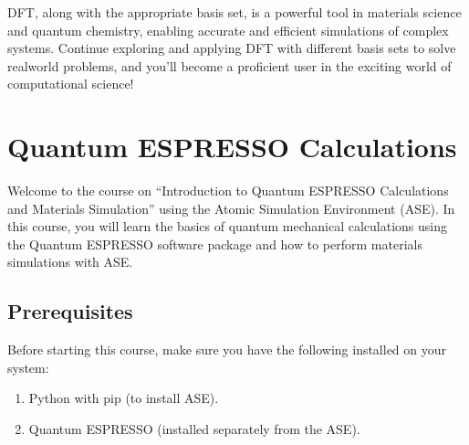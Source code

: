 \documentclass[letterpaper,10pt,english]{sphinxmanual}
\begin{document}
\sphinxAtStartPar
DFT, along with the appropriate basis set, is a powerful tool in materials science and quantum chemistry, enabling accurate and efficient simulations of complex systems. Continue exploring and applying DFT with different basis sets to solve real\sphinxhyphen{}world problems, and you’ll become a proficient user in the exciting world of computational science!

\sphinxstepscope


\chapter{Quantum ESPRESSO Calculations}
\label{\detokenize{qease/qease:quantum-espresso-calculations}}\label{\detokenize{qease/qease::doc}}


\sphinxAtStartPar
Welcome to the course on “Introduction to Quantum ESPRESSO Calculations and Materials Simulation” using the Atomic Simulation Environment (ASE). In this course, you will learn the basics of quantum mechanical calculations using the Quantum ESPRESSO software package and how to perform materials simulations with ASE.


\section{Prerequisites}
\label{\detokenize{qease/qease:prerequisites}}
\sphinxAtStartPar
Before starting this course, make sure you have the following installed on your system:
\begin{enumerate}
%
\item {} 
\sphinxAtStartPar
Python with pip (to install ASE).

\item {} 
\sphinxAtStartPar
Quantum ESPRESSO (installed separately from the ASE).

\end{enumerate}
\end{document}
